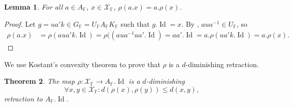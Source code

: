 \documentclass[12pt]{amsart}
\newcommand{\F}{\mathbb{F} }
\newcommand{\X}{\mathcal{X}}
\numberwithin{equation}{section}
\newtheorem{theorem}{Theorem}[section]
\newtheorem{lemma}[theorem]{Lemma}
\theoremstyle{remark} %
\begin{document}
\begin{lemma}\label{lem:rhoA}
	For all $a\in A_\F$, $x\in \X_\F$, $\rho(a.x) = a.\rho(x)$.
\end{lemma}
\begin{proof}
	Let $g=ua'k\in G_\F=U_\F A_\F K_\F$ such that $g.\operatorname{Id} = x$. By \cite[Proposition \ref{I-prop:anainN}]{AppAGRCF}, $aua^{-1} \in U_\F$, so
	\begin{align*}
		\rho(a.x) &= \rho(aua'k.\operatorname{Id}) = \rho((aua^{-1}aa'.\operatorname{Id}) = aa'.\operatorname{Id} = a .\rho(ua'k.\operatorname{Id}) = a .\rho(x). 
	\end{align*}
\end{proof}

We use Kostant's convexity theorem to prove that $\rho$ is a $d$-diminishing retraction. 
\begin{theorem}\label{thm:UAKret}
	The map $\rho \colon \X_\F \to A_\F.\operatorname{Id}$ is a $d$-diminishing
	$$
	\forall x,y \in \X_\F \colon d(\rho(x),\rho(y)) \leq d(x,y),
	$$ 
	retraction to $A_\F.\operatorname{Id}$.
\end{theorem} 
\end{document}
